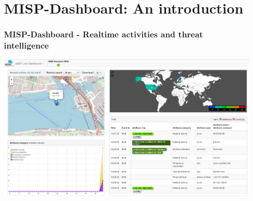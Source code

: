 \section{MISP-Dashboard: An introduction}
\begin{frame}
    \frametitle{MISP-Dashboard - Realtime activities and threat intelligence}
    \vspace{-10px}
    \begin{center}
        \includegraphics[width=1.00\linewidth]{images/dashboard-live.png}
    \end{center}
\end{frame}

